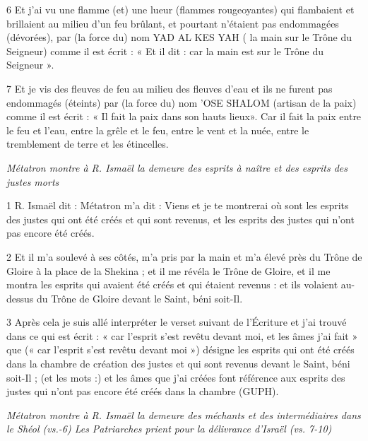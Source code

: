 \par 6 Et j'ai vu une flamme (et) une lueur (flammes rougeoyantes) qui flambaient et brillaient au milieu d'un feu brûlant, et pourtant n'étaient pas endommagées (dévorées), par (la force du) nom YAD AL KES YAH ( la main sur le Trône du Seigneur) comme il est écrit : « Et il dit : car la main est sur le Trône du Seigneur ».

\par 7 Et je vis des fleuves de feu au milieu des fleuves d'eau et ils ne furent pas endommagés (éteints) par (la force du) nom 'OSE SHALOM (artisan de la paix) comme il est écrit : « Il fait la paix dans son hauts lieux». Car il fait la paix entre le feu et l'eau, entre la grêle et le feu, entre le vent et la nuée, entre le tremblement de terre et les étincelles.


\par \textit{Métatron montre à R. Ismaël la demeure des esprits à naître et des esprits des justes morts}

\par 1 R. Ismaël dit : Métatron m'a dit : Viens et je te montrerai où sont les esprits des justes qui ont été créés et qui sont revenus, et les esprits des justes qui n'ont pas encore été créés.

\par 2 Et il m'a soulevé à ses côtés, m'a pris par la main et m'a élevé près du Trône de Gloire à la place de la Shekina ; et il me révéla le Trône de Gloire, et il me montra les esprits qui avaient été créés et qui étaient revenus : et ils volaient au-dessus du Trône de Gloire devant le Saint, béni soit-Il.

\par 3 Après cela je suis allé interpréter le verset suivant de l'Écriture et j'ai trouvé dans ce qui est écrit : « car l'esprit s'est revêtu devant moi, et les âmes j'ai fait » que (« car l'esprit s'est revêtu devant moi ») désigne les esprits qui ont été créés dans la chambre de création des justes et qui sont revenus devant le Saint, béni soit-Il ; (et les mots :) et les âmes que j'ai créées font référence aux esprits des justes qui n'ont pas encore été créés dans la chambre (GUPH).



\par \textit{Métatron montre à R. Ismaël la demeure des méchants et des intermédiaires dans le Shéol (vs.-6) Les Patriarches prient pour la délivrance d'Israël (vs. 7-10)}

